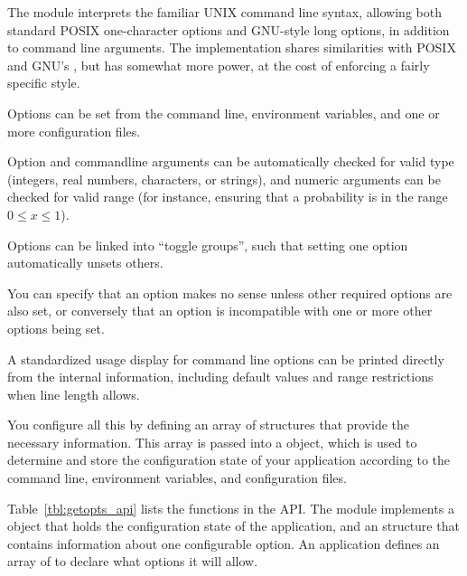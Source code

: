
The  module interprets the familiar UNIX command line
syntax, allowing both standard POSIX one-character options and
GNU-style long options, in addition to command line arguments. The
implementation shares similarities with POSIX  and
GNU's , but has somewhat more power, at the cost
of enforcing a fairly specific style.

Options can be set from the command line, environment variables, and
one or more configuration files.

Option and commandline arguments can be automatically checked for
valid type (integers, real numbers, characters, or strings), and
numeric arguments can be checked for valid range (for instance,
ensuring that a probability is in the range $0 \leq x \leq 1$).

Options can be linked into ``toggle groups'', such that setting one
option automatically unsets others. 

You can specify that an option makes no sense unless other required
options are also set, or conversely that an option is incompatible
with one or more other options being set. 

A standardized usage display for command line options can be printed
directly from the internal information, including default values and
range restrictions when line length allows. 

You configure all this by defining an array of 
structures that provide the necessary information. This array is
passed into a  object, which is used to determine
and store the configuration state of your application according to the
command line, environment variables, and configuration files.

Table~\ref{tbl:getopts_api} lists the functions in the
 API. The module implements a 
object that holds the configuration state of the application, and an
 structure that contains information about one
configurable option. An application defines an array of
 to declare what options it will allow.

